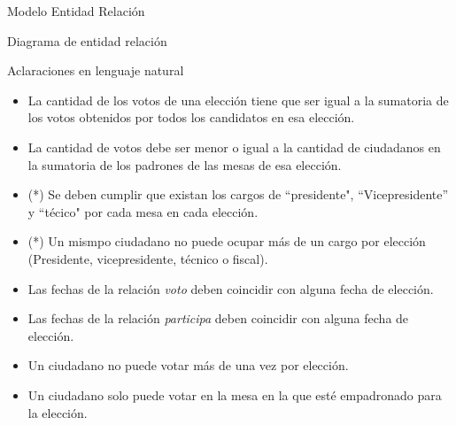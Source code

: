 \begin{section}{Modelo Entidad Relaci\'on}

\begin{subsection}{Diagrama de entidad relaci\'on}


\end{subsection}

\begin{subsection}{Aclaraciones en lenguaje natural}

\begin{itemize}

\item La cantidad de los votos de una elecci\'on tiene que ser igual a la sumatoria de los votos obtenidos por todos los candidatos en esa elecci\'on.

\item La cantidad de votos debe ser menor o igual a la cantidad de ciudadanos en la sumatoria de los padrones de las mesas de esa elecci\'on.

\item (*) Se deben cumplir que existan los cargos de ``presidente", ``Vicepresidente'' y ``t\'ecico" por cada mesa en cada elecci\'on.

\item (*) Un mismpo ciudadano no puede ocupar m\'as de un cargo por elecci\'on (Presidente, vicepresidente, t\'ecnico o fiscal).

\item Las fechas de la relaci\'on \textit{voto} deben coincidir con alguna fecha de elecci\'on.

\item Las fechas de la relaci\'on \textit{participa} deben coincidir con alguna fecha de elecci\'on.

\item Un ciudadano no puede votar m\'as de una vez por elecci\'on.

\item Un ciudadano solo puede votar en la mesa en la que est\'e empadronado para la elecci\'on.

\end{itemize}

\end{subsection}

\end{section}
